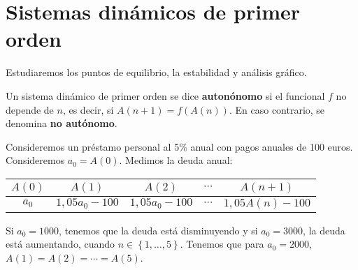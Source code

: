 \section{Sistemas dinámicos de primer orden}
Estudiaremos los puntos de equilibrio, la estabilidad y análisis gráfico. 
\begin{fdefinition}
\normalfont Un sistema dinámico de primer orden se dice \textbf{autonónomo} si el funcional $\displaystyle f $ no depende de $\displaystyle n $, es decir, si $\displaystyle A\left(n+1\right) = f\left(A\left(n\right)\right) $. En caso contrario, se denomina \textbf{no autónomo}.
\end{fdefinition}
\begin{eg}
\normalfont Consideremos un préstamo personal al 5\% anual con pagos anuales de 100 euros. Consideremos $\displaystyle a_{0} = A\left(0\right) $. Medimos la deuda anual:
\begin{center}
\begin{tabular}{|c|c|c|c|c|}
\hline 
$\displaystyle A\left(0\right) $ & $\displaystyle A\left(1\right) $ & $\displaystyle A\left(2\right) $ & $\displaystyle \cdots  $ & $\displaystyle A\left(n+1\right) $ \\
\hline 
$\displaystyle a_{0} $ & $\displaystyle 1,05a_{0}-100 $ & $\displaystyle 1,05a_{0}-100 $ & $\displaystyle \cdots  $ & $\displaystyle 1,05A\left(n\right)-100$ \\
\hline
\end{tabular}
\end{center}
Si $\displaystyle a_{0} = 1000 $, tenemos que la deuda está disminuyendo y si $\displaystyle a_{0} = 3000 $, la deuda está aumentando, cuando $\displaystyle n \in \left\{ 1, \ldots, 5\right\}  $. Tenemos que para $\displaystyle a_{0} = 2000 $, $\displaystyle A\left(1\right) = A\left(2\right) = \cdots = A\left(5\right) $.
\end{eg}

